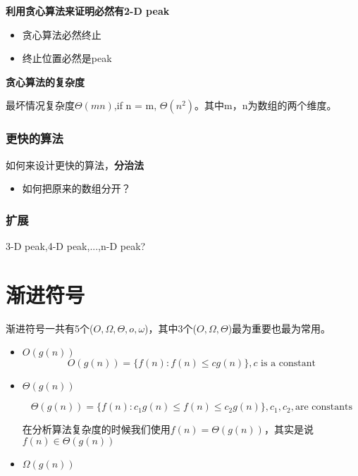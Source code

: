 \documentclass[11pt]{article}
\begin{document}
\begin{CJK}{UTF8}{gbsn}
\textbf{利用贪心算法来证明必然有2-D peak}

\begin{itemize}
\item 贪心算法必然终止
\item 终止位置必然是peak
\end{itemize}

\textbf{贪心算法的复杂度}

最坏情况复杂度$\Theta(mn)$,if n = m, $\Theta(n^2)$。其中m，n为数组的两个维度。

\subsubsection{更快的算法}

如何来设计更快的算法，\textbf{分治法}

\begin{itemize}
\item 如何把原来的数组分开？
\end{itemize}

\subsubsection{扩展}

3-D peak,4-D peak,...,n-D peak?

\section{渐进符号}

渐进符号一共有5个($O,\Omega,\Theta, o, \omega$)，其中3个($O,\Omega,\Theta$)最为重要也最为常用。

\begin{itemize}
\item $O(g(n))$
  \begin{displaymath}
    O(g(n))=\{f(n): f(n) \leqslant c g(n)\},c\mbox{ is a constant}
  \end{displaymath}

\item $\Theta(g(n))$

  \begin{displaymath}
    \Theta(g(n))=\{f(n):c_1g(n)\leqslant f(n) \leqslant c_2 g(n)\},c_1,c_2,\mbox{are constants}
  \end{displaymath}

  在分析算法复杂度的时候我们使用$f(n)=\Theta(g(n))$，其实是说$f(n)\in \Theta(g(n))$

\item $\Omega(g(n))$


\end{itemize}
\end{CJK}
\end{document}
